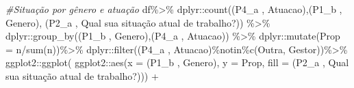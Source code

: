 \documentclass[
]{article}
\newenvironment{Shaded}{\begin{snugshade}}{\end{snugshade}}
\newcommand{\AttributeTok}[1]{\textcolor[rgb]{0.77,0.63,0.00}{#1}}
\newcommand{\CommentTok}[1]{\textcolor[rgb]{0.56,0.35,0.01}{\textit{#1}}}
\newcommand{\FunctionTok}[1]{\textcolor[rgb]{0.00,0.00,0.00}{#1}}
\newcommand{\NormalTok}[1]{#1}
\newcommand{\SpecialCharTok}[1]{\textcolor[rgb]{0.00,0.00,0.00}{#1}}
\newcommand{\StringTok}[1]{\textcolor[rgb]{0.31,0.60,0.02}{#1}}
\begin{document}
\begin{Shaded}
\begin{Highlighting}[]
\CommentTok{\#Situação por gênero e atuação}
\NormalTok{df}\SpecialCharTok{\%\textgreater{}\%}
\NormalTok{  dplyr}\SpecialCharTok{::}\FunctionTok{count}\NormalTok{(}\StringTok{\textasciigrave{}}\AttributeTok{(\textquotesingle{}P4\_a \textquotesingle{}, \textquotesingle{}Atuacao\textquotesingle{})}\StringTok{\textasciigrave{}}\NormalTok{,}\StringTok{\textasciigrave{}}\AttributeTok{(\textquotesingle{}P1\_b \textquotesingle{}, \textquotesingle{}Genero\textquotesingle{})}\StringTok{\textasciigrave{}}\NormalTok{,}
               \StringTok{\textasciigrave{}}\AttributeTok{(\textquotesingle{}P2\_a \textquotesingle{}, \textquotesingle{}Qual sua situação atual de trabalho?\textquotesingle{})}\StringTok{\textasciigrave{}}\NormalTok{) }\SpecialCharTok{\%\textgreater{}\%}
\NormalTok{  dplyr}\SpecialCharTok{::}\FunctionTok{group\_by}\NormalTok{(}\StringTok{\textasciigrave{}}\AttributeTok{(\textquotesingle{}P1\_b \textquotesingle{}, \textquotesingle{}Genero\textquotesingle{})}\StringTok{\textasciigrave{}}\NormalTok{,}\StringTok{\textasciigrave{}}\AttributeTok{(\textquotesingle{}P4\_a \textquotesingle{}, \textquotesingle{}Atuacao\textquotesingle{})}\StringTok{\textasciigrave{}}\NormalTok{) }\SpecialCharTok{\%\textgreater{}\%}
\NormalTok{  dplyr}\SpecialCharTok{::}\FunctionTok{mutate}\NormalTok{(}\AttributeTok{Prop =}\NormalTok{ n}\SpecialCharTok{/}\FunctionTok{sum}\NormalTok{(n))}\SpecialCharTok{\%\textgreater{}\%}
\NormalTok{  dplyr}\SpecialCharTok{::}\FunctionTok{filter}\NormalTok{(}\StringTok{\textasciigrave{}}\AttributeTok{(\textquotesingle{}P4\_a \textquotesingle{}, \textquotesingle{}Atuacao\textquotesingle{})}\StringTok{\textasciigrave{}}\SpecialCharTok{\%notin\%}\FunctionTok{c}\NormalTok{(}\StringTok{\textquotesingle{}Outra\textquotesingle{}}\NormalTok{, }\StringTok{\textquotesingle{}Gestor\textquotesingle{}}\NormalTok{))}\SpecialCharTok{\%\textgreater{}\%}
\NormalTok{  ggplot2}\SpecialCharTok{::}\FunctionTok{ggplot}\NormalTok{(}
\NormalTok{    ggplot2}\SpecialCharTok{::}\FunctionTok{aes}\NormalTok{(}\AttributeTok{x =} \StringTok{\textasciigrave{}}\AttributeTok{(\textquotesingle{}P1\_b \textquotesingle{}, \textquotesingle{}Genero\textquotesingle{})}\StringTok{\textasciigrave{}}\NormalTok{, }\AttributeTok{y =}\NormalTok{ Prop,}
                 \AttributeTok{fill =} \StringTok{\textasciigrave{}}\AttributeTok{(\textquotesingle{}P2\_a \textquotesingle{}, \textquotesingle{}Qual sua situação atual de trabalho?\textquotesingle{})}\StringTok{\textasciigrave{}}\NormalTok{)) }\SpecialCharTok{+}

\end{Highlighting}
\end{Shaded}
\end{document}
